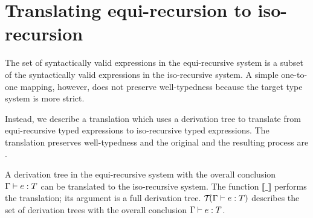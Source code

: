 \section{Translating equi-recursion to iso-recursion}

The set of syntactically valid expressions in the equi-recursive system is a
subset of the syntactically valid expressions in the iso-recursive system. A
simple one-to-one mapping, however, does not preserve well-typedness because
the target type system is more strict.

Instead, we describe a translation which uses a derivation tree to translate
from equi-recursive typed expressions to iso-recursive typed expressions. The
translation preserves well-typedness and the original and the resulting process
are . 

A derivation tree in the equi-recursive system with the overall conclusion
$\typingE e T$ can be translated to the iso-recursive system. The function
$\llbracket \_ \rrbracket$ performs the translation; its argument is a full
derivation tree. $\derivTree e T$ describes the set of derivation trees with
the overall conclusion $\typingE e T$.



% 
%   
% 
% 
% 
% 
